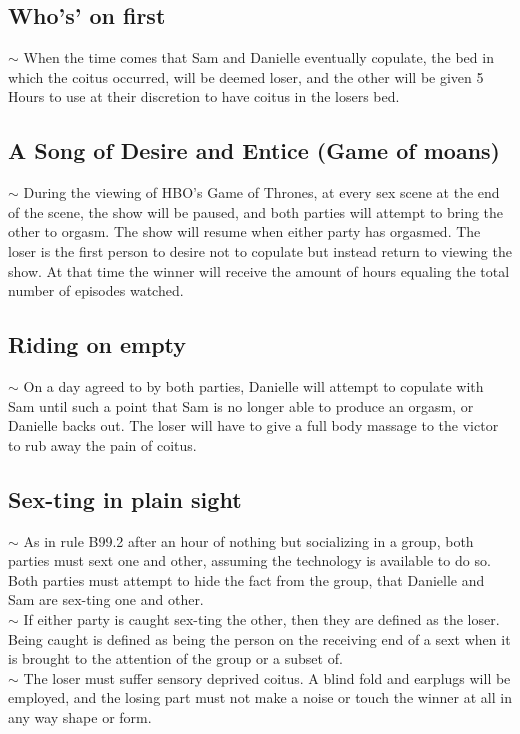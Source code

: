 \subsection{Who's' on first} 
\begin{samepage}
   \indent $\sim$ When the time comes that Sam and Danielle eventually copulate, the bed in which the coitus occurred, 
   will be deemed loser, and the other will be given 5 Hours to use at their discretion to have coitus in the losers bed.
\end{samepage}
 

 \subsection{A Song of Desire and Entice (Game of moans)}
\begin{samepage}
   \indent $\sim$ During the viewing of HBO's Game of Thrones, at every sex scene at the end of the scene,
    the show will be paused, and both parties will attempt to bring the other to orgasm.  
    The show will resume when either party has orgasmed. The loser is the first person to desire not to copulate
     but instead return to viewing the show. At that time the winner will receive the amount of hours equaling the total 
     number of episodes watched.

 

 \subsection{Riding on empty} 

   \indent $\sim$ On a day agreed to by both parties, Danielle will attempt to copulate with Sam until  
     such a point that Sam is no longer able to produce an orgasm, or Danielle backs out.  
     The loser will have to give a full body massage to the victor to rub away the pain of 
     coitus. 
\end{samepage}
 

 \subsection{Sex-ting in plain sight}  
\begin{samepage}
  \indent $\sim$ As in rule B99.2 after an hour of nothing but socializing in a group, both parties must  
     sext one and other, assuming the technology is available to do so. Both parties must attempt to hide the fact from the group, 
     that Danielle and Sam are sex-ting one and other. \\
     \indent $\sim$ \hspace{5mm} If either party is caught sex-ting the other, then they are defined as the loser.
       Being caught is defined as being the person on the receiving end of a sext when it is  
       brought to the attention of the group or a subset of.\\ 
     \indent $\sim$ \hspace{5mm} The loser must suffer sensory deprived coitus. A blind fold and earplugs will be 
       employed, and the losing part must not make a noise or touch the winner at all in any way shape or form. 
\end{samepage}

